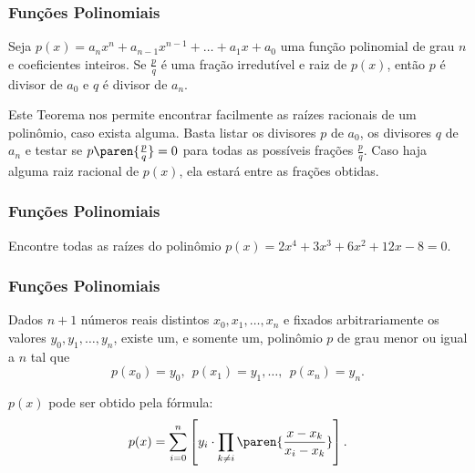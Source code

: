     
    
    \begin{frame}
    \frametitle{Funções Polinomiais} 
    \begin{teorema}
    Seja $p(x) = a_n x^n + a_{n-1} x^{n-1} + \dots + a_1 x + a_0$ uma função polinomial de grau $n$ e coeficientes inteiros. Se $\frac p q$ é uma fração irredutível e raiz de $p(x)$, então $p$ é divisor de $a_0$ e $q$ é divisor de $a_n$.
    \end{teorema}\pause
    
    Este Teorema nos permite encontrar facilmente as raízes racionais de um polinômio, caso exista alguma. Basta listar os divisores $p$ de $a_0$, os divisores $q$ de $a_n$ e testar se $p\paren {\frac p q }=0$ para todas as possíveis frações $\frac p q$. Caso haja alguma raiz racional de $p(x)$, ela estará entre as frações obtidas.
    
    \end{frame}
    
    
    \begin{frame}
    \frametitle{Funções Polinomiais} 
    
    \begin{exemplo}
    Encontre todas as raízes do polinômio $p(x)=2x^4 +3x^3 +6x^2 +12x -8 = 0$.
    \end{exemplo}
    
    \end{frame}
    
    
    \begin{frame}
    \frametitle{Funções Polinomiais} 
    \begin{proposicao}
    Dados $n+1$ números reais distintos $x_0, x_1 , \dots , x_n$ e
    fixados arbitrariamente os valores $y_0, y_1, \dots, y_n$, existe
    um, e somente um, polinômio $p$ de grau menor ou igual a $n$ tal que
    $$p(x_0) = y_0, \ \ p(x_1) = y_1,  \dots , \ \ p(x_n) = y_n.$$
    
    $p(x)$ pode ser obtido pela fórmula:
    $$p(x) = \sum_{i=0}^{n} \colc{y_i \cdot \prod_{k \neq i} \paren{\frac {x-
    x_k}{x_i-x_k}}}.$$
    \end{proposicao}
    
    \end{frame}
    
